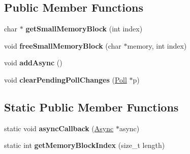 \subsection*{Public Member Functions}
\begin{DoxyCompactItemize}
\item 
\mbox{\label{structu_s_1_1_node_data_a4392ca8c27b8f58e86721377da1dec49}} 
char $\ast$ {\bfseries get\+Small\+Memory\+Block} (int index)
\item 
\mbox{\label{structu_s_1_1_node_data_a7314b340328f78687bb3c5d86c500d95}} 
void {\bfseries free\+Small\+Memory\+Block} (char $\ast$memory, int index)
\item 
\mbox{\label{structu_s_1_1_node_data_a1b8f1e1522c3c32318bbd57addc4c4ea}} 
void {\bfseries add\+Async} ()
\item 
\mbox{\label{structu_s_1_1_node_data_a0bca6b87451878a9d12bff04b6852eb5}} 
void {\bfseries clear\+Pending\+Poll\+Changes} (\mbox{\hyperlink{struct_poll}{Poll}} $\ast$p)
\end{DoxyCompactItemize}
\subsection*{Static Public Member Functions}
\begin{DoxyCompactItemize}
\item 
\mbox{\label{structu_s_1_1_node_data_a50ff099d8c7568657a50a54f73876be2}} 
static void {\bfseries async\+Callback} (\mbox{\hyperlink{struct_async}{Async}} $\ast$async)
\item 
\mbox{\label{structu_s_1_1_node_data_a445a0a4183a8a06dd302bc9d8c5582f4}} 
static int {\bfseries get\+Memory\+Block\+Index} (size\+\_\+t length)
\end{DoxyCompactItemize}
